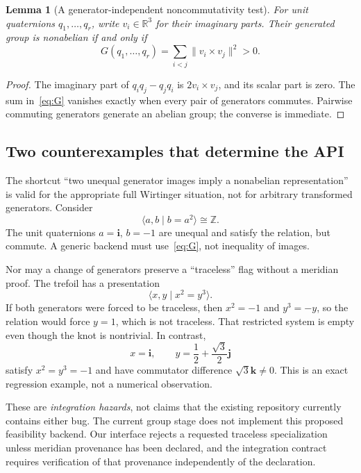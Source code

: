 \documentclass[11pt]{article}
\newtheorem{lemma}[theorem]{Lemma}
\theoremstyle{definition}
\theoremstyle{remark}
\newcommand{\RR}{\mathbb R}
\newcommand{\ZZ}{\mathbb Z}
\begin{document}
\begin{lemma}[A generator-independent noncommutativity test]
\label{lem:cross}
For unit quaternions $q_1,\ldots,q_r$, write $v_i\in\RR^3$ for their imaginary parts. Their generated group is nonabelian if and only if
\begin{equation}
G(q_1,\ldots,q_r)=\sum_{i<j}\lVert v_i\times v_j\rVert^2>0.
\label{eq:G}
\end{equation}
\end{lemma}
\begin{proof}
The imaginary part of $q_iq_j-q_jq_i$ is $2v_i\times v_j$, and its scalar part is zero. The sum in~\eqref{eq:G} vanishes exactly when every pair of generators commutes. Pairwise commuting generators generate an abelian group; the converse is immediate.
\end{proof}

\subsection{Two counterexamples that determine the API}
The shortcut ``two unequal generator images imply a nonabelian representation'' is valid for the appropriate full Wirtinger situation, not for arbitrary transformed generators. Consider
\[
\langle a,b\mid b=a^2\rangle\cong\ZZ.
\]
The unit quaternions $a=\mathbf i$, $b=-1$ are unequal and satisfy the relation, but commute. A generic backend must use~\eqref{eq:G}, not inequality of images.

Nor may a change of generators preserve a ``traceless'' flag without a meridian proof. The trefoil has a presentation
\begin{equation}
\langle x,y\mid x^2=y^3\rangle.
\label{eq:nonmerid}
\end{equation}
If both generators were forced to be traceless, then $x^2=-1$ and $y^3=-y$, so the relation would force $y=1$, which is not traceless. That restricted system is empty even though the knot is nontrivial. In contrast,
\[
x=\mathbf i,\qquad y=\frac12+\frac{\sqrt3}{2}\mathbf j
\]
satisfy $x^2=y^3=-1$ and have commutator difference $\sqrt3\mathbf k\ne0$. This is an exact regression example, not a numerical observation.

These are \emph{integration hazards}, not claims that the existing repository currently contains either bug. The current group stage does not implement this proposed feasibility backend. Our interface rejects a requested traceless specialization unless meridian provenance has been declared, and the integration contract requires verification of that provenance independently of the declaration.
\end{document}
